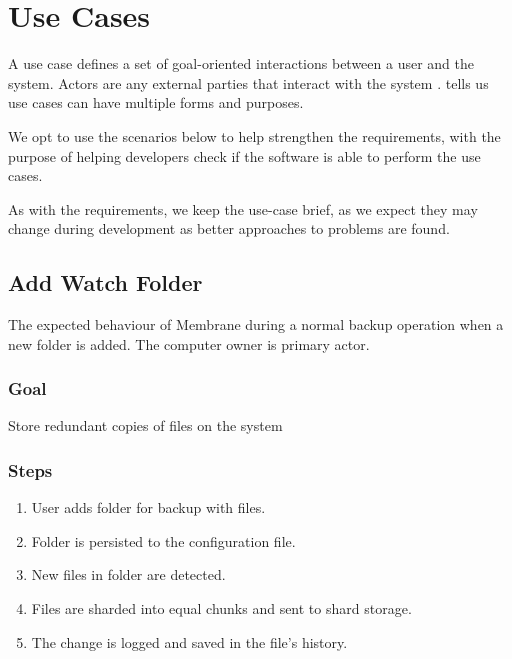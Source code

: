 \documentclass[a4paper, 11pt, twocolumn, twoside]{report}
\begin{document}
\section{Use Cases}

A use case defines a set of goal-oriented interactions between a user and the system. Actors are any external parties that interact with the system \citep{malan2001functional}. \cite{cockburn1997structuring} tells us use cases can have multiple forms and purposes.

We opt to use the scenarios below to help strengthen the requirements, with the purpose of helping developers check if the software is able to perform the use cases.

As with the requirements, we keep the use-case brief, as we expect they may change during development as better approaches to problems are found.

\subsection{Add Watch Folder}
The expected behaviour of Membrane during a normal backup operation when a new folder is added. The computer owner is primary actor.

\subsubsection{Goal}

Store redundant copies of files on the system

\subsubsection{Steps}

\begin{enumerate}
 \item User adds folder for backup with files.
 \item Folder is persisted to the configuration file.
 \item New files in folder are detected.
 \item Files are sharded into equal chunks and sent to shard storage.
 \item The change is logged and saved in the file's history.
\end{enumerate}
\end{document}
